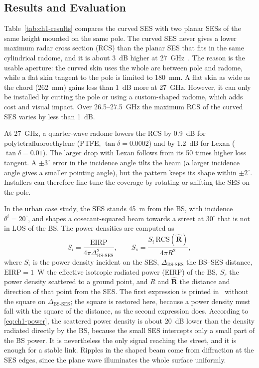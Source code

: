 \subsection{Results and Evaluation}
Table~\ref{tab:ch1-results} compares the curved SES with two planar SESs of the same height mounted on the same pole. The curved SES never gives a lower maximum radar cross section (RCS) than the planar SES that fits in the same cylindrical radome, and it is about 3~dB higher at 27~GHz~\cite{Freni2023}. The reason is the usable aperture: the curved skin uses the whole arc between pole and radome, while a flat skin tangent to the pole is limited to 180~mm. A flat skin as wide as the chord (262~mm) gains less than 1~dB more at 27~GHz. However, it can only be installed by cutting the pole or using a custom-shaped radome, which adds cost and visual impact. Over 26.5--27.5~GHz the maximum RCS of the curved SES varies by less than 1~dB.

At 27~GHz, a quarter-wave radome lowers the RCS by 0.9~dB for polytetrafluoroethylene (PTFE, $\tan\delta = 0.0002$) and by 1.2~dB for Lexan ($\tan\delta = 0.01$). The larger drop with Lexan follows from its 50 times higher loss tangent. A $\pm 3^\circ$ error in the incidence angle tilts the beam (a larger incidence angle gives a smaller pointing angle), but the pattern keeps its shape within $\pm 2^\circ$. Installers can therefore fine-tune the coverage by rotating or shifting the SES on the pole.

In the urban case study, the SES stands 45~m from the BS, with incidence $\theta^i = 20^\circ$, and shapes a cosecant-squared beam towards a street at $30^\circ$ that is not in LOS of the BS. The power densities are computed as~\cite{Freni2023}
\begin{equation}\label{eq:ch1-power}
S_i = \frac{\mathrm{EIRP}}{4\pi \Delta_{\mathrm{BS\text{-}SES}}^2}, \qquad S_s = \frac{S_i\,\mathrm{RCS}(\hat{\mathbf{R}})}{4\pi R^2},
\end{equation}
where $S_i$ is the power density incident on the SES, $\Delta_{\mathrm{BS\text{-}SES}}$ the BS--SES distance, $\mathrm{EIRP} = 1$~W the effective isotropic radiated power (EIRP) of the BS, $S_s$ the power density scattered to a ground point, and $R$ and $\hat{\mathbf{R}}$ the distance and direction of that point from the SES. The first expression is printed in~\cite{Freni2023} without the square on $\Delta_{\mathrm{BS\text{-}SES}}$; the square is restored here, because a power density must fall with the square of the distance, as the second expression does. According to \eqref{eq:ch1-power}, the scattered power density is about 20~dB lower than the density radiated directly by the BS, because the small SES intercepts only a small part of the BS power. It is nevertheless the only signal reaching the street, and it is enough for a stable link. Ripples in the shaped beam come from diffraction at the SES edges, since the plane wave illuminates the whole surface uniformly.

